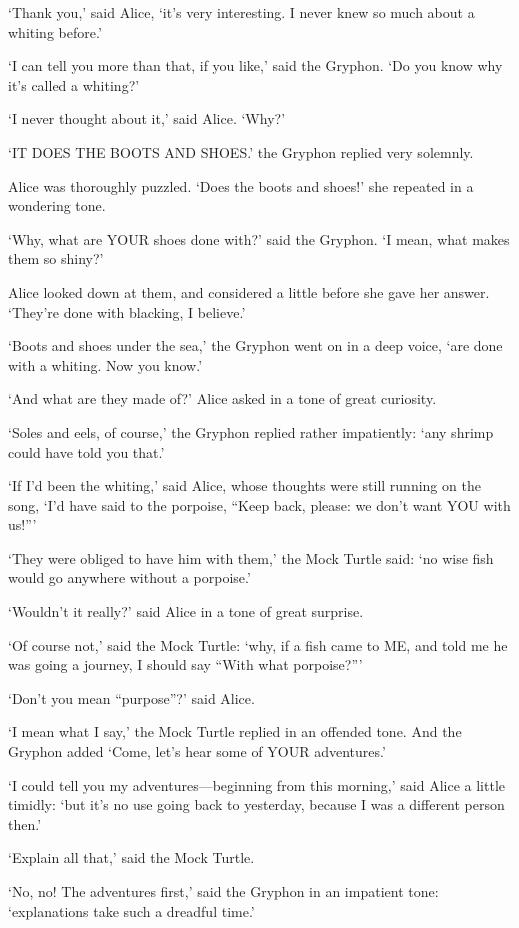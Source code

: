 \documentclass[12pt]{article}
\begin{document}
\begin{Parallel}[p]{}{}
{‘Thank you,’ said Alice, ‘it’s very interesting. I never knew so much about a whiting before.’

‘I can tell you more than that, if you like,’ said the Gryphon. ‘Do you know why it’s called a whiting?’

‘I never thought about it,’ said Alice. ‘Why?’

‘IT DOES THE BOOTS AND SHOES.’ the Gryphon replied very solemnly.

Alice was thoroughly puzzled. ‘Does the boots and shoes!’ she repeated in a wondering tone.

‘Why, what are YOUR shoes done with?’ said the Gryphon. ‘I mean, what makes them so shiny?’

Alice looked down at them, and considered a little before she gave her answer. ‘They’re done with blacking, I believe.’

‘Boots and shoes under the sea,’ the Gryphon went on in a deep voice, ‘are done with a whiting. Now you know.’

‘And what are they made of?’ Alice asked in a tone of great curiosity.

‘Soles and eels, of course,’ the Gryphon replied rather impatiently: ‘any shrimp could have told you that.’

‘If I’d been the whiting,’ said Alice, whose thoughts were still running on the song, ‘I’d have said to the porpoise, “Keep back, please: we don’t want YOU with us!”’

‘They were obliged to have him with them,’ the Mock Turtle said: ‘no wise fish would go anywhere without a porpoise.’

‘Wouldn’t it really?’ said Alice in a tone of great surprise.

‘Of course not,’ said the Mock Turtle: ‘why, if a fish came to ME, and told me he was going a journey, I should say “With what porpoise?”’

‘Don’t you mean “purpose”?’ said Alice.

‘I mean what I say,’ the Mock Turtle replied in an offended tone. And the Gryphon added ‘Come, let’s hear some of YOUR adventures.’

‘I could tell you my adventures—beginning from this morning,’ said Alice a little timidly: ‘but it’s no use going back to yesterday, because I was a different person then.’

‘Explain all that,’ said the Mock Turtle.

‘No, no! The adventures first,’ said the Gryphon in an impatient tone: ‘explanations take such a dreadful time.’

}
\end{Parallel}
\end{document}

